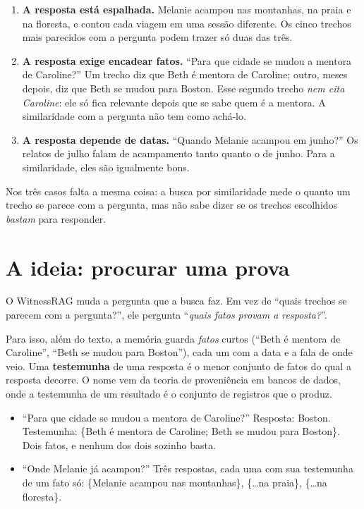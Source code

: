 \documentclass[11pt]{article}
\begin{document}
\begin{enumerate}
\item \textbf{A resposta está espalhada.} Melanie acampou nas montanhas, na
  praia e na floresta, e contou cada viagem em uma sessão diferente. Os cinco
  trechos mais parecidos com a pergunta podem trazer só duas das três.
\item \textbf{A resposta exige encadear fatos.} ``Para que cidade se mudou a
  mentora de Caroline?'' Um trecho diz que Beth é mentora de Caroline; outro,
  meses depois, diz que Beth se mudou para Boston. Esse segundo trecho
  \emph{nem cita Caroline}: ele só fica relevante depois que se sabe quem é a
  mentora. A similaridade com a pergunta não tem como achá-lo.
\item \textbf{A resposta depende de datas.} ``Quando Melanie acampou em
  junho?'' Os relatos de julho falam de acampamento tanto quanto o de junho.
  Para a similaridade, eles são igualmente bons.
\end{enumerate}

Nos três casos falta a mesma coisa: a busca por similaridade mede o quanto um
trecho se parece com a pergunta, mas não sabe dizer se os trechos escolhidos
\emph{bastam} para responder.

\section{A ideia: procurar uma prova}
\label{sec:ideia}

O WitnessRAG muda a pergunta que a busca faz. Em vez de ``quais trechos se
parecem com a pergunta?'', ele pergunta ``\emph{quais fatos provam a
resposta?}''.

Para isso, além do texto, a memória guarda \emph{fatos} curtos (``Beth é
mentora de Caroline'', ``Beth se mudou para Boston''), cada um com a data e a
fala de onde veio. Uma \textbf{testemunha} de uma resposta é o menor conjunto
de fatos do qual a resposta decorre. O nome vem da teoria de proveniência em
bancos de dados, onde a testemunha de um resultado é o conjunto de registros
que o produz.

\begin{exemplo}[: testemunhas]
\begin{itemize}
\item ``Para que cidade se mudou a mentora de Caroline?'' Resposta: Boston.
  Testemunha: \{Beth é mentora de Caroline; Beth se mudou para Boston\}. Dois
  fatos, e nenhum dos dois sozinho basta.
\item ``Onde Melanie já acampou?'' Três respostas, cada uma com sua
  testemunha de um fato só: \{Melanie acampou nas montanhas\},
  \{\dots na praia\}, \{\dots na floresta\}.
\end{itemize}
\end{exemplo}
\end{document}
